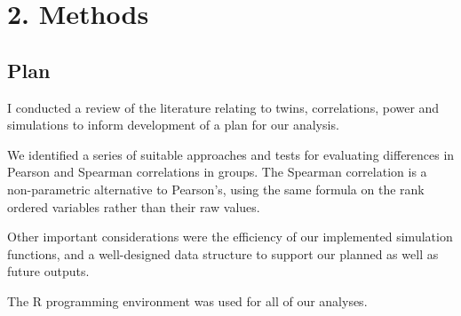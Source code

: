 \chapter*{2. Methods}
\setcounter{chapter}{2}
\setcounter{section}{0}


\section{Plan}


I conducted a review of the literature relating to twins, correlations, power and simulations to inform development of a plan for our analysis.  

We identified a series of suitable approaches and tests for evaluating differences in Pearson and Spearman correlations in groups.  The Spearman correlation is a non-parametric alternative to Pearson's, using the same formula on the rank ordered variables rather than their raw values.

Other important considerations were the efficiency of our implemented simulation functions, and a well-designed data structure to support our planned as well as future outputs.  

The R programming environment was used for all of our analyses.

